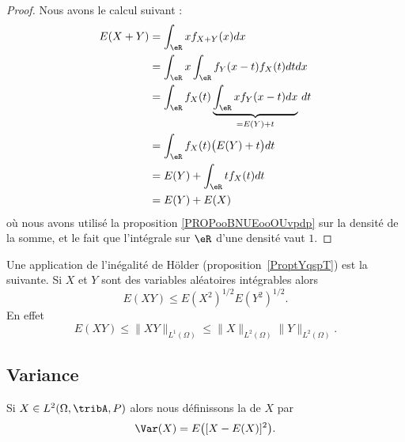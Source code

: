 \begin{proof}
	Nous avons le calcul suivant :
	\begin{subequations}
		\begin{align}
			E(X+Y) & =\int_{\eR}xf_{X+Y}(x)dx                                          \\
			       & =\int_{\eR}x\int_{\eR}f_Y(x-t)f_X(t)dtdx                          \\
			       & =\int_{\eR}f_X(t)\underbrace{\int_{\eR}xf_Y(x-t)dx}_{=E(Y)+t}\,dt \\
			       & =\int_{\eR}f_X(t)\big( E(Y)+t \big)dt                             \\
			       & =E(Y)+\int_{\eR}tf_X(t)dt                                         \\
			       & =E(Y)+E(X)
		\end{align}
	\end{subequations}
	où nous avons utilisé la proposition \ref{PROPooBNUEooOUvpdp} sur la densité de la somme, et le fait que l'intégrale sur \( \eR\) d'une densité vaut \( 1\).
\end{proof}

Une application de l'inégalité de Hölder (proposition~\ref{ProptYqspT}) est la suivante. Si \( X\) et \( Y\) sont des variables aléatoires intégrables alors
\begin{equation}
	E(XY)\leq E(X^2)^{1/2}E(Y^2)^{1/2}.
\end{equation}
En effet
\begin{equation}    \label{EqEXYleqXdYdNormHolder}
	E(XY)\leq \| XY \|_{L^1(\Omega)}\leq \| X \|_{L^2(\Omega)}\| Y \|_{L^2(\Omega)}.
\end{equation}

\subsection{Variance}

Si \( X\in L^2(\Omega,\tribA,P)\) alors nous définissons la  de \( X\) par
\begin{equation}
	\Var(X)=E\big( [X-E(X)]^2 \big).
\end{equation}

